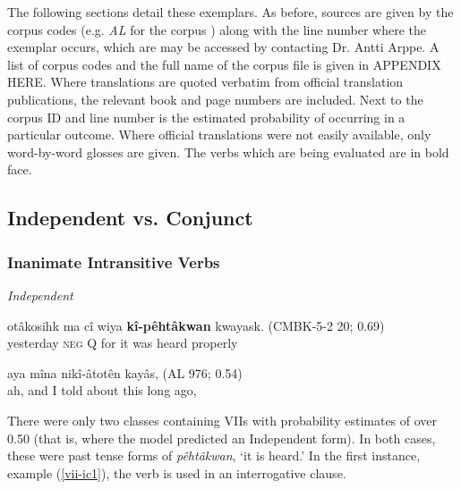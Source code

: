The following sections detail these exemplars. As before, sources are given by the corpus codes (e.g. \textit{AL} for the corpus ) along with the line number where the exemplar occurs, which are may be accessed by contacting Dr. Antti Arppe. A list of corpus codes and the full name of the corpus file is given in APPENDIX HERE. Where translations are quoted verbatim from official translation publications, the relevant book and page numbers are included. Next to the corpus ID and line number is the estimated probability of occurring in a particular outcome. Where official translations were not easily available, only word-by-word glosses are given. The verbs which are being evaluated are in bold face.

\subsection{Independent vs. Conjunct}

\subsubsection{Inanimate Intransitive Verbs}
\textit{Independent}
    \begin{exe}
    \ex
    \gll otâkosihk ma cî wiya \textbf{kî-pêhtâkwan} kwayask. \tiny{(CMBK-5-2 20; 0.69)}\\
         yesterday \textsc{neg} Q for {it was heard} properly \\
    \trans 
    \label{vii-ic1}
    \end{exe}
    
    \begin{exe}
    \ex
    \gll aya mîna nikî-âtotên kayâs, \tiny{(AL 976; 0.54)}\\
    ah, and {I told about this} {long ago},\\
    \label{vii-ic2}
    \end{exe}

There were only two classes containing VIIs with probability estimates of over 0.50 (that is, where the model predicted an Independent form). In both cases, these were past tense forms of \textit{pêhtâkwan}, `it is heard.' In the first instance, example (\ref{vii-ic1}), the verb is used in an interrogative clause.

